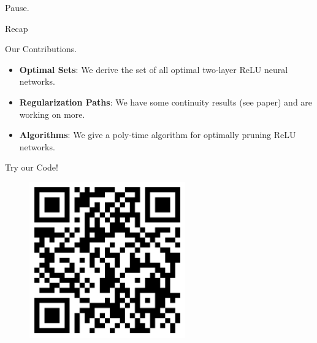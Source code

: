 \documentclass[usenames,dvipsnames,mathserif,notheorems]{beamer}
\begin{document}

\begin{frame}{}
	\begin{center}
		\huge Pause.
	\end{center}
\end{frame}

\begin{frame}{Recap}
	\begin{center}
		\huge   Our Contributions.
	\end{center}

	\vspace{2em}
	\pause
	{ \large
		\begin{itemize}
			\item \textbf{Optimal Sets}: We derive the set of all optimal
			      two-layer ReLU neural networks.
			      \pause
			      \vspace{0.5em}

			\item \textbf{Regularization Paths}: We have some continuity
			      results (see paper) and are working on more.
			      \pause
			      \vspace{0.5em}

			\item \textbf{Algorithms}: We give a poly-time algorithm for
			      optimally pruning ReLU networks.

		\end{itemize}
	}

\end{frame}




\begin{frame}{}
	\begin{center}
		\huge Try our Code!
	\end{center}

	\begin{figure}[]
		\centering
		\includegraphics[width=0.6\textwidth]{assets/github.png}
	\end{figure}
\end{frame}
\end{document}
